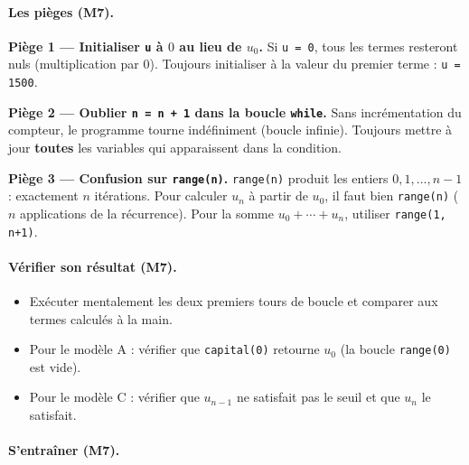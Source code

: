 \paragraph{Les pi\`eges (M7).}

\textbf{Pi\`ege 1 --- Initialiser \texttt{u} \`a $0$ au lieu de $u_0$.}
Si \texttt{u = 0}, tous les termes resteront nuls (multiplication par $0$). Toujours initialiser \`a la valeur du premier terme : \texttt{u = 1500}.

\medskip
\textbf{Pi\`ege 2 --- Oublier \texttt{n = n + 1} dans la boucle \texttt{while}.}
Sans incr\'ementation du compteur, le programme tourne ind\'efiniment (boucle infinie). Toujours mettre \`a jour \textbf{toutes} les variables qui apparaissent dans la condition.

\medskip
\textbf{Pi\`ege 3 --- Confusion sur \texttt{range(n)}.}
\texttt{range(n)} produit les entiers $0, 1, \ldots, n-1$ : exactement $n$ it\'erations. Pour calculer $u_n$ \`a partir de $u_0$, il faut bien \texttt{range(n)} ($n$ applications de la r\'ecurrence). Pour la somme $u_0 + \cdots + u_n$, utiliser \texttt{range(1, n+1)}.

\paragraph{V\'erifier son r\'esultat (M7).}
\begin{itemize}
  \item Ex\'ecuter mentalement les deux premiers tours de boucle et comparer aux termes calcul\'es \`a la main.
  \item Pour le mod\`ele A : v\'erifier que \texttt{capital(0)} retourne $u_0$ (la boucle \texttt{range(0)} est vide).
  \item Pour le mod\`ele C : v\'erifier que $u_{n-1}$ ne satisfait pas le seuil et que $u_n$ le satisfait.
\end{itemize}

\paragraph{S'entra\^iner (M7).} 
